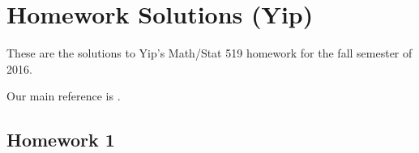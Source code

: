 \section{Homework Solutions (Yip)}
These are the solutions to Yip's Math/Stat 519 homework for the fall
semester of 2016.

Our main reference is \cite{ross}.

\subsection{Homework 1}
\begin{problem}[Ross, \S 1, \# 7]
\end{problem}
\begin{solution*}
\end{solution*}

\begin{problem}[Ross, \S 1, \# 11]
\end{problem}
\begin{solution*}
\end{solution*}

\begin{problem}[Ross, \S 1, \# 19]
\end{problem}
\begin{solution*}
\end{solution*}

\begin{problem}[Ross, \S 1, \# 21]
\end{problem}
\begin{solution*}
\end{solution*}

\begin{problem}[Ross, \S 1, \# 22]
\end{problem}
\begin{solution*}
\end{solution*}

\begin{problem}[Ross, \S 1, \# 33]
\end{problem}
\begin{solution*}
\end{solution*}

\begin{problem}[Ross, \S 1, \# 5]
\end{problem}
\begin{solution*}
\end{solution*}

\begin{problem}[Ross, \S 1, \# 6]
\end{problem}
\begin{solution*}
\end{solution*}

